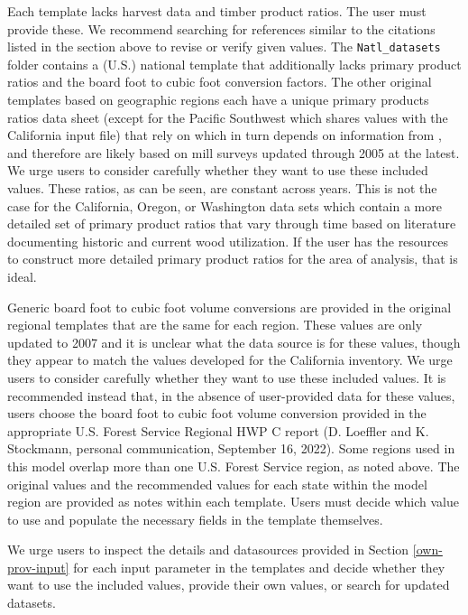 \documentclass[
  openany]{book}
\begin{document}
Each template lacks harvest data and timber product ratios. The user must provide these. We recommend searching for references similar to the citations listed in the section above to revise or verify given values. The \texttt{Natl\_datasets} folder contains a (U.S.) national template that additionally lacks primary product ratios and the board foot to cubic foot conversion factors. The other original templates based on \textcite{smith2006} geographic regions each have a unique primary products ratios data sheet (except for the Pacific Southwest which shares values with the California input file) that rely on \textcite{smith2006} which in turn depends on information from \textcite{adams2006}, and therefore are likely based on mill surveys updated through 2005 at the latest. We urge users to consider carefully whether they want to use these included values. These ratios, as can be seen, are constant across years. This is not the case for the California, Oregon, or Washington data sets which contain a more detailed set of primary product ratios that vary through time based on literature documenting historic and current wood utilization. If the user has the resources to construct more detailed primary product ratios for the area of analysis, that is ideal.

Generic board foot to cubic foot volume conversions are provided in the original regional templates that are the same for each region. These values are only updated to 2007 and it is unclear what the data source is for these values, though they appear to match the values developed for the California inventory. We urge users to consider carefully whether they want to use these included values. It is recommended instead that, in the absence of user-provided data for these values, users choose the board foot to cubic foot volume conversion provided in the appropriate U.S. Forest Service Regional HWP C report (D. Loeffler and K. Stockmann, personal communication, September 16, 2022). Some regions used in this model overlap more than one U.S. Forest Service region, as noted above. The original values and the recommended values for each state within the model region are provided as notes within each template. Users must decide which value to use and populate the necessary fields in the template themselves.

We urge users to inspect the details and datasources provided in Section \ref{own-prov-input} for each input parameter in the templates and decide whether they want to use the included values, provide their own values, or search for updated datasets.
\end{document}
